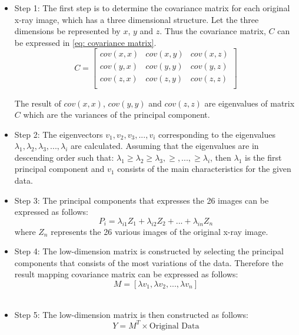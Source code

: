 \documentclass[11pt,twocolumn]{witseiepaper}
\begin{document}
	\begin{itemize}
		\item Step 1: The first step is to determine the covariance matrix for each original x-ray image, which has a three dimensional structure. Let the three dimensions be represented by $x$, $y$ and $z$. Thus the covariance matrix, $C$ can be expressed in \eqref{eq: covariance matrix}.
		\begin{equation}
		\label{eq: covariance matrix}
		C = 
		\begin{bmatrix}
		cov(x,x) & cov(x,y) & cov(x,z) \\
		cov(y,x) & cov(y,y) & cov(y,z) \\
		cov(z,x) & cov(z,y) & cov(z,z) \\
		\end{bmatrix}
		\end{equation}
		
		The result of $cov(x,x)$, $cov(y,y)$ and $cov(z,z)$ are eigenvalues of matrix $C$ which are the variances of the principal component.\\
		\item Step 2: The eigenvectors $v_1, v_2, v_3, ... , v_i$ corresponding to the eigenvalues $\lambda_1, \lambda_2, \lambda_3, ... , \lambda_i$ are calculated. Assuming that the eigenvalues are in descending order such that: $\lambda_1 \geq \lambda_2 \geq \lambda_3, \geq, ...,\geq \lambda_i$, then $\lambda_1$ is the first principal component and $v_1$ consists of the main characteristics for the given data. \\
		\item Step 3: The principal components that expresses the 26 images can be expressed as follows:
		\begin{equation}
		P_i = \lambda_{i1}Z_1 + \lambda_{i2}Z_2 + ... + \lambda_{in}Z_n
		\end{equation} 
		where $Z_n$ represents the 26 various images of the original x-ray image. \\
		\item Step 4: The low-dimension matrix is constructed by selecting the principal components that consists of the most variations of the data. Therefore the result mapping covariance matrix can be expressed as follows: 
		\begin{equation}
		M = [\lambda v_1, \lambda v_2, ... , \lambda v_n]
		\end{equation} \\
		\item Step 5: The low-dimension matrix is then constructed as follows:
		\begin{equation}
		Y = M^T \times \text{Original Data}
		\end{equation}
	\end{itemize}
	
\end{document}

